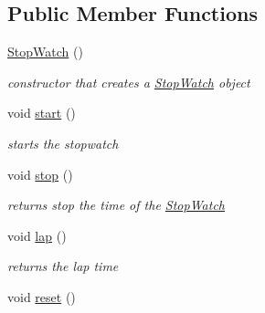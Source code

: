 \subsection*{Public Member Functions}
\begin{DoxyCompactItemize}
\item 
\hypertarget{class_stop_watch_ad715945060eeb23baa3c036ad19b1edb}{\hyperlink{class_stop_watch_ad715945060eeb23baa3c036ad19b1edb}{Stop\+Watch} ()}\label{class_stop_watch_ad715945060eeb23baa3c036ad19b1edb}

\begin{DoxyCompactList}\small\item\em constructor that creates a \hyperlink{class_stop_watch}{Stop\+Watch} object \end{DoxyCompactList}\item 
\hypertarget{class_stop_watch_a09a3c8f9ab03d7b28e4f8b90a833974e}{void \hyperlink{class_stop_watch_a09a3c8f9ab03d7b28e4f8b90a833974e}{start} ()}\label{class_stop_watch_a09a3c8f9ab03d7b28e4f8b90a833974e}

\begin{DoxyCompactList}\small\item\em starts the stopwatch \end{DoxyCompactList}\item 
\hypertarget{class_stop_watch_a6e80b598d9304e37d8768b716e713e0e}{void \hyperlink{class_stop_watch_a6e80b598d9304e37d8768b716e713e0e}{stop} ()}\label{class_stop_watch_a6e80b598d9304e37d8768b716e713e0e}

\begin{DoxyCompactList}\small\item\em returns stop the time of the \hyperlink{class_stop_watch}{Stop\+Watch} \end{DoxyCompactList}\item 
\hypertarget{class_stop_watch_a8e25f50201831578ad0b588a4ce16504}{void \hyperlink{class_stop_watch_a8e25f50201831578ad0b588a4ce16504}{lap} ()}\label{class_stop_watch_a8e25f50201831578ad0b588a4ce16504}

\begin{DoxyCompactList}\small\item\em returns the lap time \end{DoxyCompactList}\item 
\hypertarget{class_stop_watch_a1c0dcc57c615559f24bc9f8759271a9d}{void \hyperlink{class_stop_watch_a1c0dcc57c615559f24bc9f8759271a9d}{reset} ()}\label{class_stop_watch_a1c0dcc57c615559f24bc9f8759271a9d}


\end{DoxyCompactItemize}
